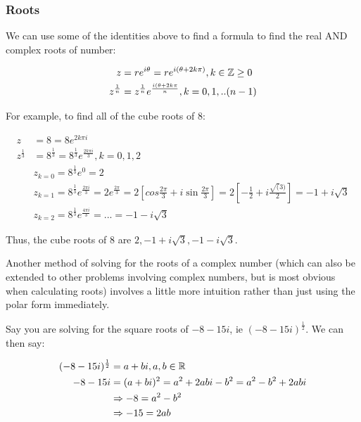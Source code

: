 \documentclass[12pt]{article}
\begin{document}
\subsubsection{Roots}

We can use some of the identities above to find a formula to find the real AND complex roots of number:

\begin{equation}
    \begin{split}
        z &= r e^{i \theta} = re^{i(\theta +2k\pi)}, k \in \mathbb{Z} \ge 0\\
        z^{\frac{1}{n}} &= z^{\frac{1}{n}}e^{\frac{i (\theta + 2k\pi}{n}}, k = 0,1,..(n-1)\\
    \end{split}
\end{equation}

For example, to find all of the cube roots of 8:

\begin{equation}
    \begin{split}
        z &= 8 = 8e^{2k\pi i}\\
        z^{\frac{1}{3}} &= 8^{\frac{1}{3}} = 8^{\frac{1}{3}}e^{\frac{2k\pi i}{3}}, k = 0,1,2\\
        &z_{k=0} = 8^{\frac{1}{3}}e^{0} = 2\\
        &z_{k=1} = 8^{\frac{1}{3}}e^{\frac{2\pi i}{3}} = 2e^{\frac{2\pi}{3}}=2[cos\frac{2\pi}{3}+i\sin\frac{2\pi}{3}] = 2[-\frac{1}{2}+i\frac{\sqrt(3)}{2}] = -1 + i \sqrt{3}\\
        &z_{k=2} = 8^{\frac{1}{3}}e^{\frac{4\pi i}{3}} = ... = -1 - i \sqrt{3}
    \end{split}
\end{equation}

Thus, the cube roots of 8 are $2, -1 + i\sqrt{3}, -1 - i\sqrt{3}$.

Another method of solving for the roots of a complex number (which can also be extended to other problems involving complex numbers, but is most obvious when calculating roots) involves a little more intuition rather than just using the polar form immediately. 

Say you are solving for the square roots of $-8-15i$, ie $(-8-15i)^\frac{1}{2}$. We can then say:

\begin{equation}
    \begin{split}
        (-8-15i)^\frac{1}{2} &= a + bi, a, b\in \mathbb{R}\\
        -8-15i &= (a + bi)^2 = a^2+2abi-b^2 = a^2-b^2+2abi\\
        &\Rightarrow-8 = a^2-b^2\\
        &\Rightarrow-15 = 2ab\\
    \end{split}
\end{equation}
\end{document}
